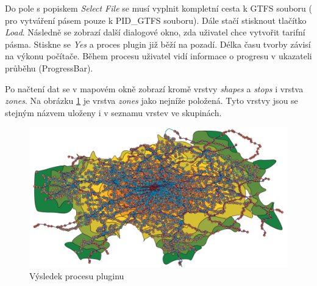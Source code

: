Do pole s popiskem \textit{Select File} se musí vyplnit kompletní cesta k GTFS  souboru (
pro vytváření pásem pouze k PID\_GTFS  souboru). Dále stačí stisknout tlačítko \textit{Load}.
Následně se zobrazí další dialogové okno, zda uživatel chce vytvořit tarifní pásma. Stiskne se
\textit{Yes} a proces plugin již běží na pozadí. Délka času tvorby závisí na výkonu počítače. 
Během procesu uživatel vidí informace o progresu v ukazateli průběhu (ProgressBar). 

Po načtení dat se v mapovém okně zobrazí kromě vrstvy \textit{shapes} a \textit{stops} i vrstva 
\textit{zones}. Na obrázku \ref{fig:gtfs_loader_vysledek} je vrstva \textit{zones}
jako nejníže položená. Tyto vrstvy jsou se stejným názvem uloženy i v seznamu vrstev ve skupinách.

\begin{figure}[H] \centering
    \includegraphics[width=400pt]{./pictures-dodatek/visualization.png}
    \caption[Výsledek procesu pluginu]{Výsledek procesu pluginu}
	\label{fig:gtfs_loader_vysledek}              
\end{figure} 